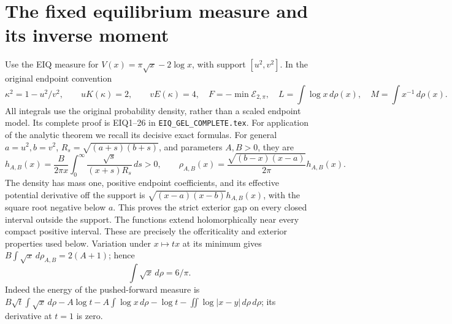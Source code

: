 \documentclass[11pt]{article}
\newcommand{\dd}{\,d}\newcommand{\Gram}{\operatorname{Gram}}
\begin{document}
\section{The fixed equilibrium measure and its inverse moment}
Use the EIQ measure for $V(x)=\pi\sqrt x-2\log x$, with support
$[u^2,v^2]$. In the original endpoint convention
\begin{equation}\tag{AG5}
 \kappa^2=1-u^2/v^2,\qquad uK(\kappa)=2,\qquad vE(\kappa)=4,
 \quad F=-\min\mathcal E_{2,\pi},\quad
 L=\int\log x\dd\rho(x),\quad M=\int x^{-1}\dd\rho(x).
\end{equation}
All integrals use the original probability density, rather than a scaled
endpoint model. Its complete proof is EIQ1--26 in
\texttt{EIQ\_GEL\_COMPLETE.tex}. For application of the analytic theorem
we recall its decisive exact formulas. For general $a=u^2,b=v^2$,
$R_s=\sqrt{(a+s)(b+s)}$, and parameters $A,B>0$, they are
\begin{equation}\tag{AG6}
 h_{A,B}(x)=\frac{B}{2\pi x}\int_0^\infty
 \frac{\sqrt s}{(x+s)R_s}\dd s>0,\qquad
 \rho_{A,B}(x)=\frac{\sqrt{(b-x)(x-a)}}{2\pi}h_{A,B}(x).
\end{equation}
The density has mass one, positive endpoint coefficients, and its effective
potential derivative off the support is
$\sqrt{(x-a)(x-b)}h_{A,B}(x)$, with the square root negative below $a$.
This proves the strict exterior gap on every closed interval outside the
support. The functions extend holomorphically near every compact positive
interval. These are precisely the offcriticality and exterior properties
used below. Variation under $x\mapsto tx$ at its minimum gives
$B\int\sqrt x\dd\rho_{A,B}=2(A+1)$; hence
\begin{equation}\tag{AG7}
 \int\sqrt x\dd\rho=6/\pi.
\end{equation}
Indeed the energy of the pushed-forward measure is
$B\sqrt t\int\sqrt x\dd\rho-A\log t-A\int\log x\dd\rho
-\log t-\iint\log|x-y|\dd\rho\dd\rho$; its derivative at $t=1$ is zero.
\end{document}
